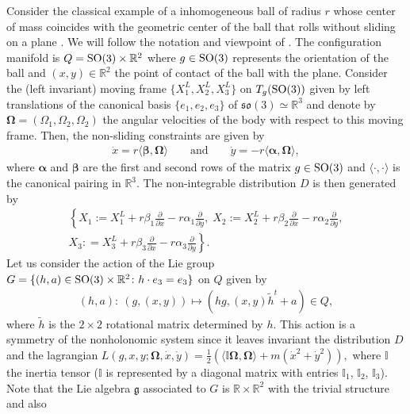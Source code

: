 \documentclass[pdftex]{sigma}
\numberwithin{equation}{section}
\def\R{\mathbb{R}}
\def\g{\mathfrak{g}}
\def\vecOm{\boldsymbol{\Omega}}
\newcommand{\SO}{{\rm SO}}
\def\so{\mathfrak{so}}
\def\vecalpha{\boldsymbol{\alpha}}
\def\vecbeta{\boldsymbol{\beta}}
\begin{document}
Consider the classical example of a inhomogeneous ball of radius $r$ whose center of mass coincides with the geometric center of the ball that rolls without sliding on a plane \cite{BoMa2001,BoMaKi2002}. We will follow the notation and viewpoint of \cite{Paula, Luis}.  The conf\/iguration manifold is $Q = \SO(3) \times \R^2$ where $g \in \SO(3)$ represents the orientation of the ball and $(x,y)\in \R^2$ the point of contact of the ball with the plane. Consider the (left invariant) moving frame $\{X_1^L, X_2^L, X_3^L \}$ on $T_g(\SO(3))$ given by left translations of the canonical basis $\{e_1, e_2, e_3\}$ of $\so (3) \simeq \R^3$ and denote by $\vecOm = (\Omega_1, \Omega_2, \Omega_2)$ the angular velocities of the body with respect to this moving frame.  Then, the non-sliding constraints are given by
\begin{gather*}
\dot x = r \langle \vecbeta, \vecOm\rangle \qquad \mbox{and} \qquad  \dot y = - r\langle \vecalpha, \vecOm\rangle,
\end{gather*}
where $\vecalpha$ and $\vecbeta$ are the f\/irst and second rows of the matrix $g\in\SO(3)$ and $\langle \cdot, \cdot \rangle$ is the canonical pairing in $\R^3$. The non-integrable distribution $D$ is then generated by
\begin{gather*}
\left\{ X_1 := X_1^L + r\beta_1 \frac{\partial}{\partial x} - r \alpha_1 \frac{\partial}{\partial y} , \; X_2 := X_2^L + r \beta_2 \frac{\partial}{\partial x} - r\alpha_2 \frac{\partial}{\partial y},\right.\\
\left. X_3 : = X_3^L + r \beta_3 \frac{\partial}{\partial x} - r\alpha_3 \frac{\partial}{\partial y} \right\} .
\end{gather*}
Let us consider the action of the Lie group $G=\{ (h,a) \in \SO(3) \times \R^2 \colon h\cdot e_3 = e_3 \}$ on $Q$ given by
\begin{gather*}
(h,a) \colon \ (g, (x,y)) \mapsto (h g, (x,y) \tilde h^t + a) \in Q,
\end{gather*}
where $\tilde h$ is the $2\times 2$ rotational matrix determined by $h$.  This action is a symmetry of the nonholonomic system since it leaves invariant the distribution $D$ and the lagrangian $L (g, x,y; \vecOm, \dot x, \dot y) = \frac{1}{2}\left( \langle \mathbb{I} \vecOm, \vecOm \rangle + m( \dot x^2 + \dot y^2) \right),
$ where $\mathbb{I}$ the inertia tensor ($\mathbb{I}$ is represented by a diagonal matrix with entries $\mathbb{I}_1$, $\mathbb{I}_2$, $\mathbb{I}_3$). Note that the Lie algebra $\g$ associated to $G$ is $\R\times \R^2$ with the trivial structure and also
\end{document}
